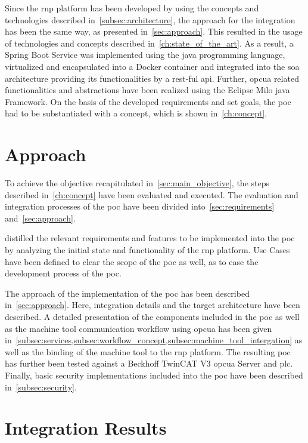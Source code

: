 \documentclass[
a4paper,
twoside,
headsepline,
cleardoublepage=empty,
parskip=half,
draft=false
]{scrbook}
\begin{document}
			Since the \gls{rnp} platform has been developed by using the concepts and technologies described in~\cref{subsec:architecture}, the approach for the integration has been the same way, as presented in~\cref{sec:approach}. This resulted in the usage of technologies and concepts described in~\cref{ch:state_of_the_art}. As a result, a Spring Boot Service was implemented using the \gls{java} programming language, virtualized and encapsulated into a Docker container and integrated into the \gls{soa} architecture providing its functionalities by a \gls{rest}-ful \gls{api}. Further, \gls{opcua} related functionalities and abstractions have been realized using the Eclipse Milo \gls{java} Framework. 
			On the basis of the developed requirements and set goals, the \gls{poc} had to be substantiated with a concept, which is shown in~\cref{ch:concept}.
		
		\section{Approach}\label{sec:discussion_approach}
		
			To achieve the objective recapitulated in~\cref{sec:main_objective}, the steps described in~\cref{ch:concept} have been evaluated and executed. The evaluation and integration processes of the \gls{poc} have been divided into~\cref{sec:requirements} and~\cref{sec:approach}.
			
			 distilled the relevant requirements and features to be implemented into the \gls{poc} by analyzing the initial state and functionality of the \gls{rnp} platform. Use Cases have been defined to clear the scope of the \gls{poc} as well, as to ease the development process of the \gls{poc}.
			
			The approach of the implementation of the \gls{poc} has been described in~\cref{sec:approach}. Here, integration details and the target architecture have been described. A detailed presentation of the components included in the \gls{poc} as well as the machine tool communication workflow using \gls{opcua} has been given in~\cref{subsec:services,subsec:workflow_concept,subsec:machine_tool_intergation} as well as the binding of the machine tool to the \gls{rnp} platform. 
			The resulting \gls{poc} has further been tested against a Beckhoff TwinCAT V3 \gls{opcua} Server and \gls{plc}.
			Finally, basic security implementations included into the \gls{poc} have been described in~\cref{subsec:security}.
			
		\section{Integration Results}\label{sec:integration_results}
\end{document}
